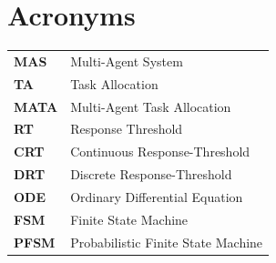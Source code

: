 \documentclass[12pt]{book}
\begin{document}
%	
%




\newpage
\section*{Acronyms}
\begin{center}
\begin{table}[!ht]
\centering\begin{tabular}{lp{8.5cm}}
	\textbf{MAS} & Multi-Agent System\\
	\textbf{TA} & Task Allocation\\
	\textbf{MATA} & Multi-Agent Task Allocation\\
	\textbf{RT} & Response Threshold\\
	\textbf{CRT} & Continuous Response-Threshold\\
	\textbf{DRT} & Discrete Response-Threshold\\
	\textbf{ODE} & Ordinary Differential Equation\\
	\textbf{FSM} & Finite State Machine\\
	\textbf{PFSM} & Probabilistic Finite State Machine
\end{tabular}
\end{table}
\end{center}
\end{document}
